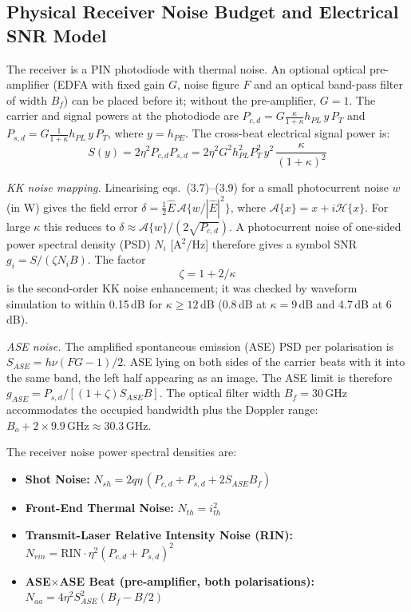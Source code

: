 \subsection{Physical Receiver Noise Budget and Electrical SNR Model}

The receiver is a PIN photodiode with thermal noise. An optional optical pre-amplifier (EDFA with fixed gain $G$, noise figure $F$ and an optical band-pass filter of width $B_f$) can be placed before it; without the pre-amplifier, $G=1$. The carrier and signal powers at the photodiode are $P_{c,d}=G\frac{\kappa}{1+\kappa}h_{PL}\,y\,P_T$ and $P_{s,d}=G\frac{1}{1+\kappa}h_{PL}\,y\,P_T$, where $y=h_{PE}$. The cross-beat electrical signal power is:
\begin{equation}
S(y)=2\eta^2P_{c,d}P_{s,d}=2\eta^2G^2h_{PL}^2P_T^2\,y^2\,\frac{\kappa}{(1+\kappa)^2}
\end{equation}

\emph{KK noise mapping.} Linearising eqs.~(3.7)--(3.9) for a small photocurrent noise $w$ (in W) gives the field error $\delta=\tfrac12\hat E\,\mathcal A\{w/|\hat E|^2\}$, where $\mathcal A\{x\}=x+i\mathcal H\{x\}$. For large $\kappa$ this reduces to $\delta\approx\mathcal A\{w\}/(2\sqrt{P_{c,d}})$. A photocurrent noise of one-sided power spectral density (PSD) $N_i$ [A$^2$/Hz] therefore gives a symbol SNR $g_i=S/(\zeta N_iB)$. The factor
\[
\zeta=1+2/\kappa
\]
is the second-order KK noise enhancement; it was checked by waveform simulation to within 0.15\,dB for $\kappa\ge12$\,dB (0.8\,dB at $\kappa=9$\,dB and 4.7\,dB at 6\,dB).

\emph{ASE noise.} The amplified spontaneous emission (ASE) PSD per polarisation is $S_{ASE}=h\nu(FG-1)/2$. ASE lying on both sides of the carrier beats with it into the same band, the left half appearing as an image. The ASE limit is therefore $g_{ASE}=P_{s,d}/[(1+\zeta)S_{ASE}B]$. The optical filter width $B_f=30$\,GHz accommodates the occupied bandwidth plus the Doppler range: $B_o+2\times9.9\,\mathrm{GHz}\approx30.3$\,GHz.

The receiver noise power spectral densities are:

\begin{itemize}
\item \textbf{Shot Noise:} $N_{sh}=2q\eta\,(P_{c,d}+P_{s,d}+2S_{ASE}B_f)$
\item \textbf{Front-End Thermal Noise:} $N_{th}=i_{th}^2$
\item \textbf{Transmit-Laser Relative Intensity Noise (RIN):} $N_{rin}=\mathrm{RIN}\cdot\eta^2(P_{c,d}+P_{s,d})^2$
\item \textbf{ASE$\times$ASE Beat (pre-amplifier, both polarisations):} $N_{aa}=4\eta^2S_{ASE}^2(B_f-B/2)$
\end{itemize}

